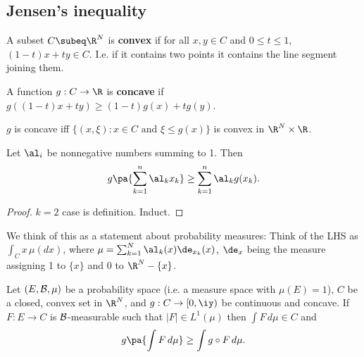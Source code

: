 
\subsection{Jensen's inequality}
\begin{df}
A subset $C\subeq \R^N$ is \textbf{convex} if for all $x,y\in C$ and $0\le t\le 1$, $(1-t)x+ty\in C$. I.e. if it contains two points it contains the line segment joining them.

A function $g:C\to \R$ is \textbf{concave} if $g((1-t)x+ty)\ge (1-t)g(x)+tg(y)$. 
\end{df}
\begin{pr}
$g$ is concave iff $\{(x,\xi):x\in C\text{ and } \xi\le g(x)\}$ is convex in $\R^N\times \R$.
\end{pr}
\begin{thm}
Let $\al_i$ be nonnegative numbers summing to 1. Then
\[
g\pa{
\sum_{k=1}^n \al_kx_k
}\ge\sum_{k=1}^n \al_kg(x_k).
\]
\end{thm}
\begin{proof}
$k=2$ case is definition. Induct.
\end{proof}
We think of this as a statement about probability measures: Think of the LHS as $\int_C x\,\mu(dx)$, where $\mu=\sum_{k=1}^N\al_k(x)\de_{x_k}(x)$, $\de_{x}$ being the measure assigning 1 to $\{x\}$ and 0 to $\R^N-\{x\}$.
\begin{thm}
Let $(E,\cal B, \mu)$ be a probability space (i.e. a measure space with $\mu(E)=1$), $C$ be a closed, convex set in $\R^N$, and $g:C\to [0,\iy)$ be continuous and concave. If $F: E\to C$ is $\cal B$-measurable such that $|F|\in L^1(\mu)$ then $\int F\,d\mu\in C$ and
\[
g\pa{\int F\,d\mu}\ge \int g\circ F\,d\mu.
\]
\end{thm}
